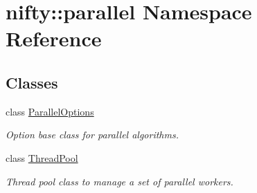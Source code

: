 \hypertarget{namespacenifty_1_1parallel}{}\section{nifty\+:\+:parallel Namespace Reference}
\label{namespacenifty_1_1parallel}
\subsection*{Classes}
\begin{DoxyCompactItemize}
\item 
class \hyperlink{classnifty_1_1parallel_1_1ParallelOptions}{Parallel\+Options}
\begin{DoxyCompactList}\small\item\em Option base class for parallel algorithms. \end{DoxyCompactList}\item 
class \hyperlink{classnifty_1_1parallel_1_1ThreadPool}{Thread\+Pool}
\begin{DoxyCompactList}\small\item\em Thread pool class to manage a set of parallel workers. \end{DoxyCompactList}\end{DoxyCompactItemize}
